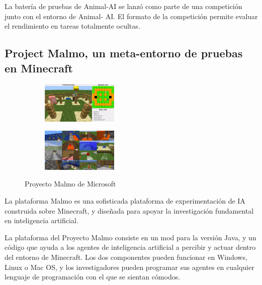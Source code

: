 La batería de pruebas de Animal-AI se lanzó como parte de una competición junto con el entorno de Animal- AI. El formato de la competición permite evaluar el rendimiento en tareas totalmente ocultas.

\subsection{Project Malmo, un meta-entorno de pruebas en Minecraft}\label{section:state-of-the-art:evaluation-enviroments-for-generalization-on-rl-algoritms:malmo}

\begin{figure}[ht!]
    \centering
    \begin{subfigure}
      \centering
      \includegraphics[width=0.4\textwidth]{Graphics/malmo-1.jpeg}
      \label{fig:malmo1}
    \end{subfigure}%
    \begin{subfigure}
      \centering
      \includegraphics[width=0.4\textwidth]{Graphics/malmo-2.jpeg}
      \label{fig:malmo2}
    \end{subfigure}%
    \caption{Proyecto Malmo de Microsoft}
    \label{fig:malmo}
\end{figure}

La plataforma Malmo es una sofisticada plataforma de experimentación de IA construida sobre Minecraft, y diseñada para apoyar la investigación fundamental en inteligencia artificial.

La plataforma del Proyecto Malmo consiste en un mod para la versión Java, y un código que ayuda a los agentes de inteligencia artificial a percibir y actuar dentro del entorno de Minecraft. Los dos componentes pueden funcionar en Windows, Linux o Mac OS, y los investigadores pueden programar sus agentes en cualquier lenguaje de programación con el que se sientan cómodos.

